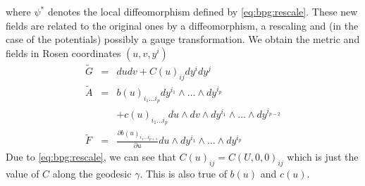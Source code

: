 \documentclass[11pt, a4paper, titlepage]{article}
\begin{document}
where $\psi^*$ denotes the local diffeomorphism defined by
\eqref{eq:bpg:rescale}. These new fields are related to the original ones by a
diffeomorphism, a rescaling and (in the case of the potentials) possibly a gauge
transformation. We obtain the metric and fields in Rosen \cite{rosen}
coordinates $(u,v,y^i)$
\begin{eqnarray}
  \label{eq:bpg:target:G}
  \widetilde{G}&=& dudv + C(u)_{ij}dy^i dy^j \\
  \label{eq:bpg:target:A}
  \widetilde{A}&=& b(u)_{i_1\ldots i_p}dy^{i_1}
  \wedge\ldots\wedge dy^{i_p} \\ \nonumber
  &&+c(u)_{i_1\ldots i_p} du\wedge
  dv\wedge dy^{i_1}\wedge\ldots\wedge dy^{i_{p-2}}\\
  \label{eq:bpg:target:F}
  \widetilde{F}&=&\frac{\partial b(u)_{i_1\ldots i_{p+1}}}{\partial u}
  du\wedge dy^{i_1}\wedge\ldots\wedge dy^{i_p}
\end{eqnarray}
Due to \eqref{eq:bpg:rescale}, we can see that $C(u)_{ij}=C(U,0,0)_{ij}$ which
is just the value of $C$ along the geodesic $\gamma$. This is also true of
$b(u)$ and $c(u)$.
\end{document}

